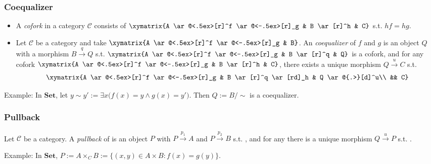 \documentclass[UTF8,aspectratio=43,11pt,colorlinks,compress,openany]{beamer}%
\begin{document}
\begin{frame}\frametitle{Coequalizer}
\setlength\abovedisplayskip{0pt}
\setlength\belowdisplayskip{0pt}
\begin{itemize}
	\item A \emph{cofork} in a category $\mathcal{C}$ consists of $\xymatrix{A \ar@<.5ex>[r]^f \ar@<-.5ex>[r]_g & B \ar[r]^h & C}$ s.t. $hf=hg$.
	\item Let $\mathcal{C}$ be a category and take $\xymatrix{A \ar@<.5ex>[r]^f \ar@<-.5ex>[r]_g & B}$. An \emph{coequalizer} of $f$ and $g$ is an object $Q$ with a morphism $B\xrightarrow{q} Q$ s.t. $\xymatrix{A \ar@<.5ex>[r]^f \ar@<-.5ex>[r]_g & B \ar[r]^q & Q}$ is a cofork, and for any cofork $\xymatrix{A \ar@<.5ex>[r]^f \ar@<-.5ex>[r]_g & B \ar[r]^h & C}$, there exists a unique morphism $Q\xrightarrow{u} C$ s.t. 
\[
\begin{array}{c}
\xymatrix{A \ar@<.5ex>[r]^f \ar@<-.5ex>[r]_g & B \ar[r]^q \ar[rd]_h & Q \ar@{.>}[d]^u\\
&& C}
\end{array}
\]
\end{itemize}
Example: In $\mathbf{Set}$, let $y\sim y':=\exists x\big(f(x)=y\wedge g(x)=y'\big)$. Then $Q:=B/\sim$ is a coequalizer.
\end{frame}

\begin{frame}\frametitle{Pullback}
\setlength\abovedisplayskip{0pt}
\setlength\belowdisplayskip{0pt}
Let $\mathcal{C}$ be a category. A \emph{pullback} of  is an object $P$ with $P\xrightarrow{p_1} A$ and $P\xrightarrow{p_2} B$ s.t. , and for any  there is a unique morphism $Q\xrightarrow{u} P$ s.t.
.

Example: In $\mathbf{Set}$, $P:=A\times_C B:=\big\{(x,y)\in A\times B: f(x)=g(y)\big\}$.
\end{frame}
\end{document}

